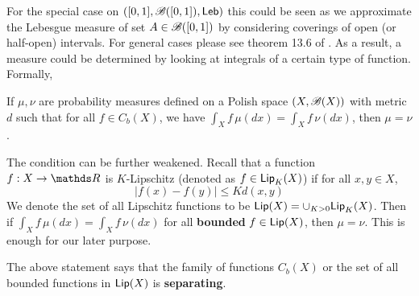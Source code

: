 For the special case on $([0,1], \mathcal{B}([0,1]), \mathsf{Leb})$ this could be seen as we approximate the Lebesgue measure of set $A \in \mathcal{B}([0,1])$ by considering coverings of open (or half-open) intervals. For general cases please see theorem 13.6 of \cite{AchimProbability}. As a result, a measure could be determined by looking at integrals of a certain type of function. Formally,
\begin{lemma} \label{lem:uniqueness_by_integral}
If $\mu, \nu$ are probability measures defined on a Polish space $(X,\mathcal{B}(X))$ with metric $d$ such that for all $f \in C_b(X)$, we have $\int_X f \, \mu(dx) = \int_X f \, \nu(dx)$, then $\mu = \nu$.
\end{lemma}

\begin{remark} 
The condition can be further weakened. Recall that a function $f:X \to \R$ is $K$-Lipschitz (denoted as $f \in \mathsf{Lip}_K(X)$) if for all $x,y \in X$,
\begin{equation}
    |f(x) - f(y)| \leq K d(x,y)
\end{equation}
We denote the set of all Lipschitz functions to be $\mathsf{Lip}(X) = \cup_{K>0} \mathsf{Lip}_K(X)$. Then if $\int_X f \, \mu(dx) = \int_X f \, \nu(dx)$ for all \textbf{bounded} $f \in \mathsf{Lip}(X)$, then $\mu = \nu$. This is enough for our later purpose.
\end{remark}

The above statement says that the family of functions $C_b(X)$ or the set of all bounded functions in $\mathsf{Lip}(X)$ is \textbf{separating}.

